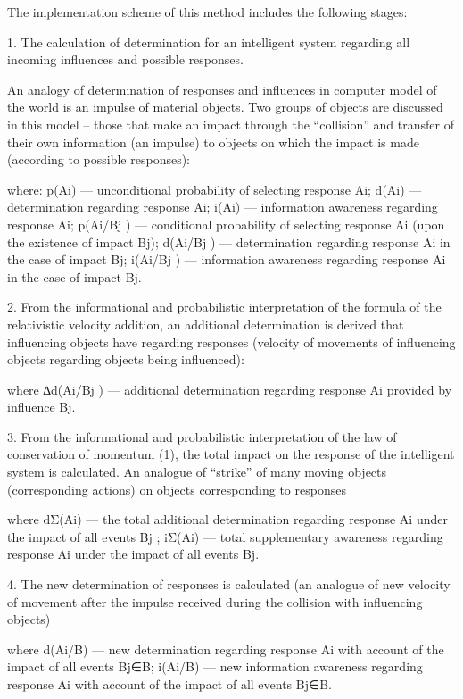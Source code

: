 The implementation scheme of this method includes the following stages:

1. The calculation of determination for an intelligent system regarding all incoming influences and possible responses.

An analogy of determination of responses and influences in computer model of the world is an impulse of material objects. Two groups of objects are discussed in this model – those that make an impact through the “collision” and transfer of their own information (an impulse) to objects on which the impact is made (according to possible responses): 

where: p(Ai) — unconditional probability of selecting response Ai; d(Ai) — determination regarding response Ai; i(Ai) — information awareness regarding response Ai; p(Ai/Bj ) — conditional probability of selecting response Ai (upon the existence of impact Bj); d(Ai/Bj ) — determination regarding response Ai in the case of impact Bj; i(Ai/Bj ) — information awareness regarding response Ai in the case of impact Bj.

2. From the informational and probabilistic interpretation of the formula of the relativistic velocity addition, an additional determination is derived that influencing objects have regarding responses (velocity of movements of influencing objects regarding objects being influenced): 



where ∆d(Ai/Bj ) — additional determination regarding response Ai provided by influence Bj. 

3. From the informational and probabilistic interpretation of the law of conservation of momentum (1), the total impact on the response of the intelligent system is calculated. An analogue of “strike” of many moving objects (corresponding actions) on objects corresponding to responses


where dΣ(Ai) — the total additional determination regarding response Ai under the impact of all events Bj ; iΣ(Ai) — total supplementary awareness regarding response Ai under the impact of all events Bj. 

4. The new determination of responses is calculated (an analogue of new velocity of movement after the impulse received during the collision with influencing objects)


where d(Ai/B) — new determination regarding response Ai with account of the impact of all events Bj∈B; i(Ai/B) — new information awareness regarding response Ai with account of the impact of all events Bj∈B.

